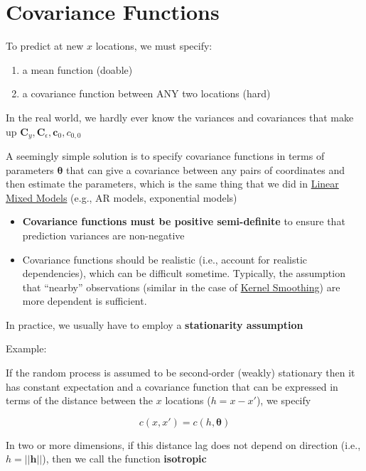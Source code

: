 \documentclass[
]{book}
\providecommand{\tightlist}{%
  \setlength{\itemsep}{0pt}\setlength{\parskip}{0pt}}
\begin{document}
\hypertarget{covariance-functions}{%
\section{Covariance Functions}\label{covariance-functions}}

To predict at new \(x\) locations, we must specify:

\begin{enumerate}
\def\labelenumi{\arabic{enumi}.}
\tightlist
\item
  a mean function (doable)
\item
  a covariance function between ANY two locations (hard)
\end{enumerate}

In the real world, we hardly ever know the variances and covariances that make up \(\mathbf{C}_y, \mathbf{C}_\epsilon, \mathbf{c}_0, c_{0,0}\)

A seemingly simple solution is to specify covariance functions in terms of parameters \(\mathbf{\theta}\) that can give a covariance between any pairs of coordinates and then estimate the parameters, which is the same thing that we did in \href{https://bookdown.org/mike/data_analysis/linear-mixed-models.html}{Linear Mixed Models} (e.g., AR models, exponential models)

\begin{itemize}
\item
  \textbf{Covariance functions must be positive semi-definite} to ensure that prediction variances are non-negative
\item
  Covariance functions should be realistic (i.e., account for realistic dependencies), which can be difficult sometime. Typically, the assumption that ``nearby'' observations (similar in the case of \protect\hyperlink{kernel-smoothing}{Kernel Smoothing}) are more dependent is sufficient.
\end{itemize}

In practice, we usually have to employ a \textbf{stationarity assumption}

Example:

If the random process is assumed to be second-order (weakly) stationary then it has constant expectation and a covariance function that can be expressed in terms of the distance between the \(x\) locations (\(h = x- x'\)), we specify

\[
c(x,x') = c(h, \mathbf{\theta})
\]

In two or more dimensions, if this distance lag does not depend on direction (i.e., \(h = ||\mathbf{h}||\)), then we call the function \textbf{isotropic}
\end{document}
